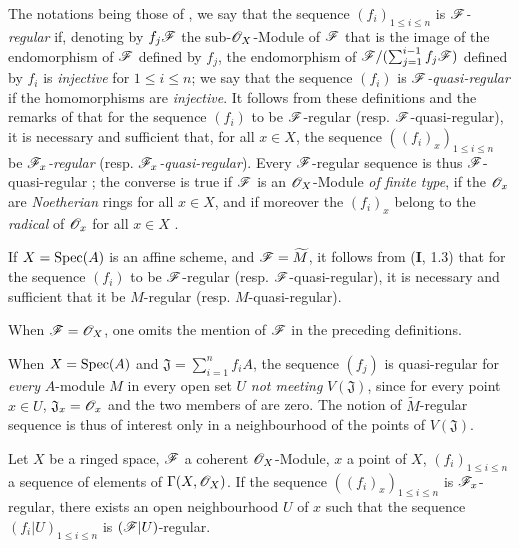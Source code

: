 \begin{env}[15.2.2]
\label{0.15.2.2}
The notations being those of , we say that the sequence $(f_i)_{1\leq i\leq n}$ is \emph{$\mathscr{F}$-regular} if, denoting by $f_j\mathscr{F}$ the sub-$\mathscr{O}_X$-Module of $\mathscr{F}$ that is the image of the endomorphism of $\mathscr{F}$ defined by $f_j$, the endomorphism of $\mathscr{F}/(\sum_{j=1}^{i-1}f_j\mathscr{F})$ defined by $f_i$ is \emph{injective} for $1\leq i\leq n$;
we say that the sequence $(f_i)$ is \emph{$\mathscr{F}$-quasi-regular} if the homomorphisms  are \emph{injective}.
It follows from these definitions and the remarks of  that for the sequence $(f_i)$ to be $\mathscr{F}$-regular (resp. $\mathscr{F}$-quasi-regular), it is necessary and sufficient that, for all $x\in X$, the sequence $((f_i)_x)_{1\leq i\leq n}$ be \emph{$\mathscr{F}_x$-regular} (resp. \emph{$\mathscr{F}_x$-quasi-regular}).
Every $\mathscr{F}$-regular sequence is thus $\mathscr{F}$-quasi-regular ;
the converse is true if $\mathscr{F}$ is an $\mathscr{O}_X$-Module \emph{of finite type}, if the $\mathscr{O}_x$ are \emph{Noetherian} rings for all $x\in X$, and if moreover the $(f_i)_x$ belong to the \emph{radical} of $\mathscr{O}_x$ for all $x\in X$ .

If $X=\operatorname{Spec}(A)$ is an affine scheme, and $\mathscr{F}=\widetilde{M}$, it follows from ($\mathbf{I}$, 1.3) that for the sequence $(f_i)$ to be $\mathscr{F}$-regular (resp. $\mathscr{F}$-quasi-regular), it is necessary and sufficient that it be $M$-regular (resp. $M$-quasi-regular).

When $\mathscr{F}=\mathscr{O}_X$, one omits the mention of $\mathscr{F}$ in the preceding definitions.
\end{env}

\begin{remark}[15.2.3]
\label{0.15.2.3}
When $X=\operatorname{Spec}(A)$ and $\mathfrak{J}=\sum_{i=1}^n f_iA$, the sequence $(f_j)$ is quasi-regular for \emph{every} $A$-module $M$ in every open set $U$ \emph{not meeting} $V(\mathfrak{J})$, since for every point $x\in U$, $\mathfrak{J}_x=\mathscr{O}_x$ and the two members of  are zero.
The notion of $\widetilde{M}$-regular sequence is thus of interest only in a neighbourhood of the points of $V(\mathfrak{J})$.
\end{remark}

\begin{proposition}[15.2.4]
\label{0.15.2.4}
Let $X$ be a ringed space, $\mathscr{F}$ a coherent $\mathscr{O}_X$-Module, $x$ a point of $X$, $(f_i)_{1\leq i\leq n}$ a sequence of elements of $\Gamma(X,\mathscr{O}_X)$.
If the sequence $((f_i)_x)_{1\leq i\leq n}$ is $\mathscr{F}_x$-regular, there exists an open neighbourhood $U$ of $x$ such that the sequence $(f_i|U)_{1\leq i\leq n}$ is $(\mathscr{F}|U)$-regular.
\end{proposition}

